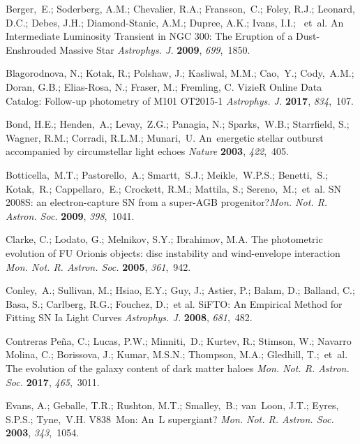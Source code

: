 \documentclass[galaxies,article,accept,moreauthors,pdftex]{mdpi}
\makeatletter
\let\jnl@style=\rmfamily
\def\ref@jnl#1{{\jnl@style#1}}%
\newcommand\apj{\ref@jnl{Astrophys. J.}}%
\newcommand\mnras{\ref@jnl{Mon. Not. R. Astron. Soc.}}%
\newcommand\nat{\ref@jnl{Nature}}%
\makeatother
\begin{document}
\begin{thebibliography}{999}
 Berger,~E.; Soderberg, A.M.; Chevalier, R.A.; Fransson,~C.; Foley, R.J.; Leonard, D.C.; Debes, J.H.; Diamond-Stanic, A.M.; Dupree, A.K.; Ivans, I.I.; ~et~al. An Intermediate Luminosity Transient in NGC 300: The Eruption of a Dust-Enshrouded Massive Star {\em \apj} \textbf{2009}, {\em 699},~1850.


 Blagorodnova, N.; Kotak, R.; Polshaw, J.; Kasliwal, M.M.; Cao,~Y.; Cody,~A.M.; Doran, G.B.; Elias-Rosa, N.; Fraser, M.; Fremling, C. VizieR Online Data Catalog: Follow-up photometry of M101 OT2015-1 {\em\apj} \textbf{2017}, {\em 834},~107. 


 Bond, H.E.; Henden,~A.; Levay,~Z.G.; Panagia, N.; Sparks,~W.B.; Starrfield, S.; Wagner, R.M.; Corradi, R.L.M.; Munari,~U. An~energetic stellar outburst accompanied by circumstellar light echoes {\em \nat} \textbf{2003}, {\em 422},~405.



 Botticella,~M.T.; Pastorello,~A.; Smartt,~S.J.; Meikle,~W.P.S.; Benetti,~S.; Kotak,~R.; Cappellaro,~E.; Crockett, R.M.; Mattila, S.; Sereno,~M.;~et~al. SN 2008S: an electron-capture SN from a super-AGB progenitor?{\em \mnras} \textbf{2009}, {\em 398},~1041.



 Clarke, C.; Lodato, G.; Melnikov, S.Y.; Ibrahimov, M.A. The photometric evolution of FU Orionis objects: disc instability and wind-envelope interaction  {\em \mnras} \textbf{2005}, {\em 361},~942.


 Conley,~A.; Sullivan, M.; Hsiao, E.Y.; Guy, J.; Astier, P.; Balam, D.; Balland, C.; Basa, S.; Carlberg, R.G.; Fouchez, D.;~et al. SiFTO: An Empirical Method for Fitting SN Ia Light Curves {\em \apj} \textbf{2008}, {\em 681},~482.


 Contreras Pe{\~n}a, C.; Lucas, P.W.; Minniti,~D.; Kurtev, R.; Stimson, W.; Navarro Molina, C.; Borissova, J.; Kumar, M.S.N.; Thompson, M.A.; Gledhill, T.;~et~al. The evolution of the galaxy content of dark matter haloes {\em \mnras} \textbf{2017}, {\em 465},~3011.


 Evans, A.; Geballe, T.R.; Rushton, M.T.; Smalley,~B.; van~Loon, J.T.; Eyres, S.P.S.; Tyne,~V.H. V838~Mon: An~L supergiant? {\em \mnras} \textbf{2003}, \emph{343},~1054.


\end{thebibliography}
\end{document}
